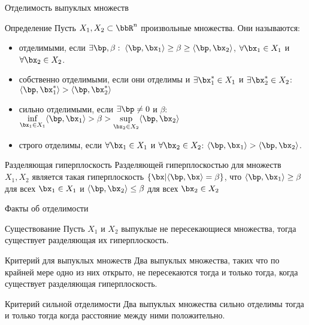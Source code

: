 \documentclass[12pt]{beamer}
\begin{document}
\begin{frame}{Отделимость выпуклых множеств}
\small
\begin{block}{Определение}
Пусть $X_1, X_2 \subset \bbR^n$ произвольные множества. Они называются:
\vspace{-3mm}
\begin{itemize}
\item отделимыми, если $\exists \bp, \beta: \; \langle\bp, \bx_1 \rangle \geq \beta \geq \langle \bp, \bx_2\rangle$, $\forall \bx_1 \in X_1$ и $\forall \bx_2 \in X_2$.
\vspace{-3mm}
\item собственно отделимыми, если они отделимы и $\exists \bx_1^* \in X_1$ и $\exists \bx_2^* \in X_2$: $\langle \bp, \bx_1^* \rangle > \langle \bp, \bx_2^* \rangle$
\vspace{-3mm}
\item сильно отделимыми, если $\exists \bp \neq 0$ и $\beta$: $\inf\limits_{\bx_1 \in X_1} \langle \bp, \bx_1 \rangle > \beta > \sup\limits_{\bx_2 \in X_2} \langle \bp, \bx_2 \rangle$
\vspace{-3mm}
\item строго отделимы, если $\forall \bx_1 \in X_1$ и $\forall \bx_2 \in X_2$: $\langle \bp, \bx_1 \rangle > \langle \bp, \bx_2 \rangle$.
\end{itemize} 
\end{block}

\begin{block}{Разделяющая гиперплоскость}
Разделяющей гиперплоскостью для множеств $X_1, X_2$ является такая гиперплоскость $\{ \bx | \langle \bp, \bx \rangle = \beta \}$, что $\langle \bp, \bx_1 \rangle \geq \beta$ для всех $\bx_1 \in X_1$ и $\langle \bp, \bx_2 \rangle \leq \beta$ для всех $\bx_2 \in X_2$   
\end{block}
\end{frame}

\begin{frame}{Факты об отделимости}
\begin{block}{Существование}
Пусть $X_1$ и $X_2$ выпуклые не пересекающиеся множества, тогда существует разделяющая их гиперплоскость. 
\end{block}

\begin{block}{Критерий для выпуклых множеств}
Два выпуклых множества, таких что по крайней мере одно из них открыто, не пересекаются тогда и только тогда, когда существует разделяющая гиперплоскость.
\end{block}

\begin{block}{Критерий сильной отделимости}
Два выпуклых множества сильно отделимы тогда и только тогда когда расстояние между ними положительно.
\end{block}

\end{frame}
\end{document}

